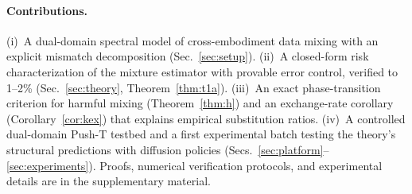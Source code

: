 \paragraph{Contributions.}
(i)~A dual-domain spectral model of cross-embodiment data mixing with an explicit mismatch decomposition (Sec.~\ref{sec:setup}).
(ii)~A closed-form risk characterization of the mixture estimator with provable error control, verified to 1--2\% (Sec.~\ref{sec:theory}, Theorem~\ref{thm:t1a}).
(iii)~An exact phase-transition criterion for harmful mixing (Theorem~\ref{thm:h}) and an exchange-rate corollary (Corollary~\ref{cor:kex}) that explains empirical substitution ratios.
(iv)~A controlled dual-domain Push-T testbed and a first experimental batch testing the theory's structural predictions with diffusion policies (Secs.~\ref{sec:platform}--\ref{sec:experiments}).
Proofs, numerical verification protocols, and experimental details are in the supplementary material.
